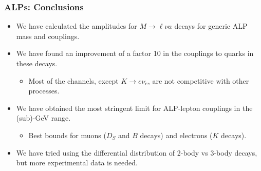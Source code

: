 \documentclass[mathserif, 10pt]{beamer}
\begin{document}
\begin{frame}\frametitle{ALPs: Conclusions}
    \begin{itemize}
        \item We have calculated the amplitudes for $M\to \ell \nu a$ decays for generic ALP mass and couplings.
        \item We have found an improvement of a factor 10 in the couplings to quarks in these decays.
              \begin{itemize}
                  \item Most of the channels, except $K\to e\nu_e$, are not competitive with other processes.
              \end{itemize}
        \item We have obtained the most stringent limit for ALP-lepton couplings in the (sub)-GeV range.
              \begin{itemize}
                  \item Best bounds for muons ($D_S$ and $B$ decays) and electrons ($K$ decays).
              \end{itemize}
        \item We have tried using the differential distribution of 2-body vs 3-body decays, but more experimental data is needed.
    \end{itemize}
\end{frame}
\end{document}
